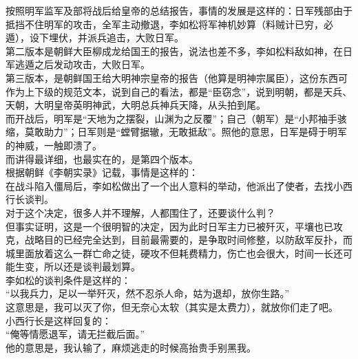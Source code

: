 \begin{multicols}{\theparacolNo}
按照明军监军及部将战后给皇帝的总结报告，事情的发展是这样的：日军残部由于抵挡不住明军的攻击，全军主动撤退，李如松将军神机妙算（料贼计已穷，必遁），设下埋伏，并派兵追击，大败日军。\\

第二版本是朝鲜大臣柳成龙给国王的报告，说法也差不多，李如松料敌如神，在日军逃遁之后发动攻击，大败日军。\\

第三版本，是朝鲜国王给大明神宗皇帝的报告（他算是明神宗属臣），这份东西可作为上下级的规范文本，说到自己的看法，都是“臣窃念”，说到明朝，都是天兵、天朝，大明皇帝英明神武，大明总兵神兵天降，从头拍到尾。\\

而开战后，明军是“天地为之摆裂，山渊为之反覆”；自己（朝军）是“小邦袖手骇缩，莫敢助力”；日军则是“螳臂据辙，无敢抵敌”。照他的意思，日军是碍于明军的神威，一触即溃了。\\

而讲得最详细，也最实在的，是第四个版本。\\

根据朝鲜《李朝实录》记载，事情是这样的：\\

在战斗陷入僵局后，李如松做出了一个出人意料的举动，他派出了使者，去找小西行长谈判。\\

对于这个决定，很多人并不理解，人都围住了，还要谈什么判？\\

但事实证明，这是一个很明智的决定，因为此时日军主力已被歼灭，平壤也已攻克，战略目的已经完全达到，目前最需要的，是争取时间修整，以防敌军反扑，而城里面放着这么一群亡命之徒，硬攻不但耗费精力，伤亡也会很大，时间一长还可能生变，所以还是谈判最划算。\\

李如松的谈判条件是这样的：\\

“以我兵力，足以一举歼灭，然不忍杀人命，姑为退却，放你生路。”\\

这意思是，我可以灭了你，但无奈心太软（其实是太费力），就放你们走了吧。\\

小西行长是这样回复的：\\

“俺等情愿退军，请无拦截后面。”\\

他的意思是，我认输了，麻烦逃走的时候高抬贵手别黑我。\\


\end{multicols}
